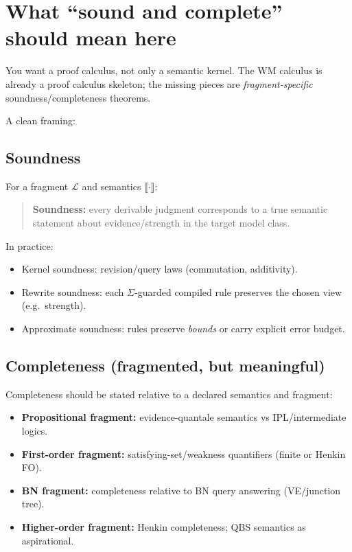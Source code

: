 \documentclass[11pt]{article}
\begin{document}
\section{What ``sound and complete'' should mean here}

You want a proof calculus, not only a semantic kernel.
The WM calculus is already a proof calculus skeleton; the missing pieces are \emph{fragment-specific}
soundness/completeness theorems.

A clean framing:

\subsection{Soundness}

For a fragment $\mathcal{L}$ and semantics $\llbracket\cdot\rrbracket$:
\begin{quote}
\textbf{Soundness:} every derivable judgment corresponds to a true semantic statement
about evidence/strength in the target model class.
\end{quote}

In practice:
\begin{itemize}[leftmargin=2em]
\item Kernel soundness: revision/query laws (commutation, additivity).
\item Rewrite soundness: each $\Sigma$-guarded compiled rule preserves the chosen view (e.g.\ strength).
\item Approximate soundness: rules preserve \emph{bounds} or carry explicit error budget.
\end{itemize}

\subsection{Completeness (fragmented, but meaningful)}

Completeness should be stated relative to a declared semantics and fragment:
\begin{itemize}[leftmargin=2em]
\item \textbf{Propositional fragment:} evidence-quantale semantics vs IPL/intermediate logics.
\item \textbf{First-order fragment:} satisfying-set/weakness quantifiers (finite or Henkin FO).
\item \textbf{BN fragment:} completeness relative to BN query answering (VE/junction tree).
\item \textbf{Higher-order fragment:} Henkin completeness; QBS semantics as aspirational.
\end{itemize}
\end{document}
